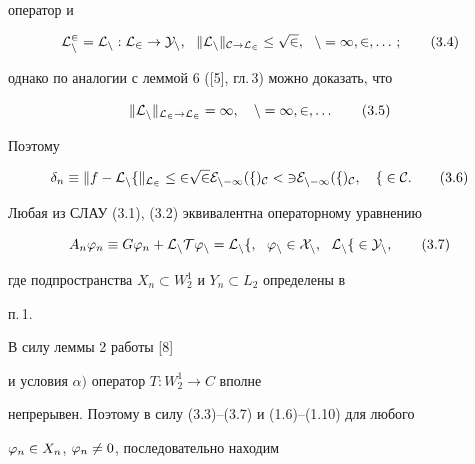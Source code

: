 оператор и


\begin{equation}


\rL^2_n=\rL_n:L_2\to Y_n,\ \ \|\rL_n\|_{C\to L_2}\le \sqrt{2},


\ \ n=1,2,\dotsc;


\tag{3.4}


\end{equation}


однако по аналогии с леммой 6 ([5], гл.\,3) можно доказать, что


\begin{equation}


\|\rL_n\|_{L_2\to L_2}=\infty,\quad n=1,2,\dotsc


\tag{3.5}


\end{equation}


Поэтому


\begin{equation}


\delta_n\equiv\|f-\rL_nf\|_{L_2}\le 2\sqrt{2}E_{n-1}(f)_C


<3E_{n-1}(f)_C,\quad f\in C.


\tag{3.6}


\end{equation}





Любая из СЛАУ (3.1), (3.2) эквивалентна операторному уравнению


\begin{equation}


A_n\vp_n\equiv G\vp_n+\rL_nT\vp_n=\rL_nf,\ \ \vp_n\in X_n,\ \ \rL_nf


\in Y_n,


\tag{3.7}


\end{equation}


где подпространства $X_n\subset W^1_2$ и $Y_n\subset L_2$ определены в


п.\,1.


В силу леммы 2 работы [8] 


и условия $\alpha)$ оператор $T:W^1_2\to C$ вполне 


непрерывен. Поэтому в силу (3.3)--(3.7) и (1.6)--(1.10) для любого 


$\varphi_n\in X_n$, $\varphi_n\ne0$, последовательно находим


